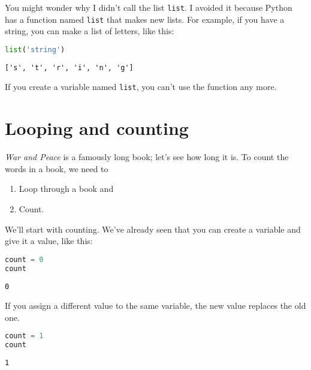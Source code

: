 You might wonder why I didn't call the list
\passthrough{\lstinline!list!}. I avoided it because Python has a
function named \passthrough{\lstinline!list!} that makes new lists. For
example, if you have a string, you can make a list of letters, like
this:

\begin{lstlisting}[language=Python,style=source]
list('string')
\end{lstlisting}

\begin{lstlisting}[style=output]
['s', 't', 'r', 'i', 'n', 'g']
\end{lstlisting}

If you create a variable named \passthrough{\lstinline!list!}, you can't
use the function any more.

\hypertarget{looping-and-counting}{%
\section{Looping and counting}\label{looping-and-counting}}

\emph{War and Peace} is a famously long book; let's see how long it is.
To count the words in a book, we need to

\begin{enumerate}
\def\labelenumi{\arabic{enumi}.}
\item
  Loop through a book and
\item
  Count.
\end{enumerate}

We'll start with counting. We've already seen that you can create a
variable and give it a value, like this:

\begin{lstlisting}[language=Python,style=source]
count = 0
count
\end{lstlisting}

\begin{lstlisting}[style=output]
0
\end{lstlisting}

If you assign a different value to the same variable, the new value
replaces the old one.

\begin{lstlisting}[language=Python,style=source]
count = 1
count
\end{lstlisting}

\begin{lstlisting}[style=output]
1
\end{lstlisting}

